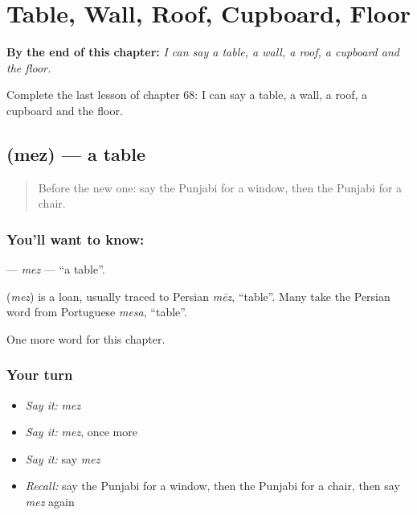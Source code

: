 
\chapter{Table, Wall, Roof, Cupboard, Floor}
\label{ch:pa-table-wall-roof-cupboard-floor}

\begin{chapteropening}
\textbf{By the end of this chapter:} \emph{I can say a table, a wall, a roof, a cupboard and the floor.}

Complete the last lesson of chapter 68: I can say a table, a wall, a roof, a cupboard and the floor.
\end{chapteropening}

\section[\texorpdfstring{\pa{ਮੇਜ਼} (mez)}{ਮੇਜ਼ (mez)}]{ (mez) — a table}

\label{lesson:PA-C68-mez}



\begin{quote}
Before the new one: say the Punjabi for a window, then the Punjabi for a chair.
\end{quote}

\subsection*{You'll want to know: }
\textbf{} — \emph{mez} — \textquotedblleft{}a table\textquotedblright{}.

\begin{cousinweb}
\textbf{} (\emph{mez}) is a loan, usually traced to Persian \emph{mēz}, \textquotedblleft{}table\textquotedblright{}. Many take the Persian word from Portuguese \emph{mesa}, \textquotedblleft{}table\textquotedblright{}.
\end{cousinweb}

\begin{grammarlens}[title={What you've built}]
One more word for this chapter.
\end{grammarlens}

\subsection*{Your turn}
\begin{itemize}
\raggedright
  \item \emph{Say it:} \emph{mez}
  \item \emph{Say it:} \emph{mez}, once more
  \item \emph{Say it:} say \emph{mez}
  \item \emph{Recall:} say the Punjabi for a window, then the Punjabi for a chair, then say \emph{mez} again
\end{itemize}

